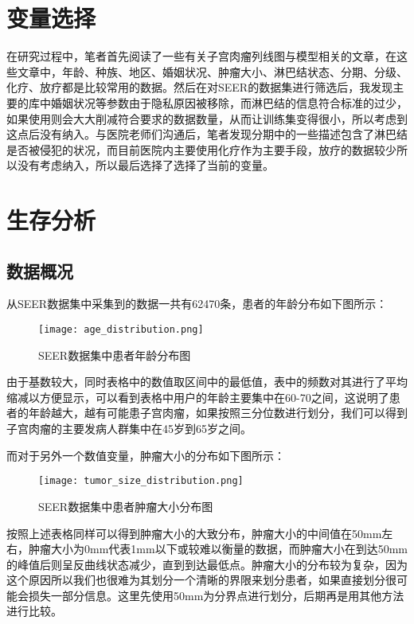 \section{变量选择}

在研究过程中，笔者首先阅读了一些有关子宫肉瘤列线图与模型相关的文章\cite{novel_tool}，在这些文章中，年龄、种族、地区、婚姻状况、肿瘤大小、淋巴结状态、分期、分级、化疗、放疗都是比较常用的数据。然后在对SEER的数据集进行筛选后，我发现主要的库中婚姻状况等参数由于隐私原因被移除，而淋巴结的信息符合标准的过少，如果使用则会大大削减符合要求的数据数量，从而让训练集变得很小，所以考虑到这点后没有纳入。与医院老师们沟通后，笔者发现分期中的一些描述包含了淋巴结是否被侵犯的状况，而目前医院内主要使用化疗作为主要手段，放疗的数据较少所以没有考虑纳入，所以最后选择了选择了当前的变量。

\section{生存分析}

\subsection{数据概况}

从SEER数据集中采集到的数据一共有62470条，患者的年龄分布如下图所示：
\begin{figure}[!htbp]
    \centering
    \texttt{[image: age\_distribution.png]}
    \caption{SEER数据集中患者年龄分布图} \label{fig:age_distribution}
\end{figure}

由于基数较大，同时表格中的数值取区间中的最低值，表中的频数对其进行了平均缩减以方便显示，可以看到表格中用户的年龄主要集中在60-70之间，这说明了患者的年龄越大，越有可能患子宫肉瘤，如果按照三分位数进行划分，我们可以得到子宫肉瘤的主要发病人群集中在45岁到65岁之间。

而对于另外一个数值变量，肿瘤大小的分布如下图所示：

\begin{figure}[!htbp]
    \centering
    \texttt{[image: tumor\_size\_distribution.png]}
    \caption{SEER数据集中患者肿瘤大小分布图} \label{fig:tumor_size_distribution}
\end{figure}

按照上述表格同样可以得到肿瘤大小的大致分布，肿瘤大小的中间值在50mm左右，肿瘤大小为0mm代表1mm以下或较难以衡量的数据，而肿瘤大小在到达50mm的峰值后则呈反曲线状态减少，直到到达最低点。肿瘤大小的分布较为复杂，因为这个原因所以我们也很难为其划分一个清晰的界限来划分患者，如果直接划分很可能会损失一部分信息。这里先使用50mm为分界点进行划分，后期再是用其他方法进行比较。

